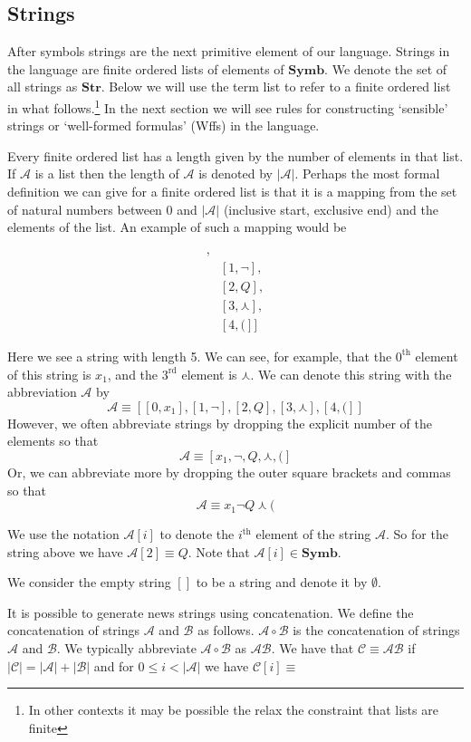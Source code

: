 \documentclass[12pt]{article}
\newcommand{\mc}[1]{\mathcal{#1}}
\begin{document}
\subsection{Strings}

After symbols strings are the next primitive element of our language.
Strings in the language are finite ordered lists of elements of $\textbf{Symb}$.
We denote the set of all strings as $\textbf{Str}$.
Below we will use the term list to refer to a finite ordered list in what follows.\footnote{In other contexts it may be possible the relax the constraint that lists are finite}
In the next section we will see rules for constructing `sensible' strings or `well-formed formulas' (Wffs) in the language.

Every finite ordered list has a length given by the number of elements in that list.
If $\mc{A}$ is a list then the length of $\mc{A}$ is denoted by $|\mc{A}|$.
Perhaps the most formal definition we can give for a finite ordered list is that it is a mapping from the set of natural numbers between 0 and $|\mc{A}|$ (inclusive start, exclusive end) and the elements of the list. 
An example of such a mapping would be

\begin{align*}
[&[0, x_1],\\
&[1, \lnot],\\
&[2, Q],\\
&[3, \curlywedge],\\
&[4, (]]
\end{align*}

Here we see a string with length 5.
We can see, for example, that the $0^{\text{th}}$ element of this string is $x_1$, and the $3^{\text{rd}}$ element is $\curlywedge$.
We can denote this string with the abbreviation $\mc{A}$ by 
$$
\mc{A} \equiv [[0, x_1], [1, \lnot], [2, Q], [3, \curlywedge], [4, (]]
$$
However, we often abbreviate strings by dropping the explicit number of the elements so that
$$
\mc{A} \equiv [x_1, \lnot, Q, \curlywedge, (]
$$
Or, we can abbreviate more by dropping the outer square brackets and commas so that
$$
\mc{A} \equiv x_1\lnot Q \curlywedge (
$$

We use the notation $\mc{A}[i]$ to denote the $i^{\text{th}}$ element of the string $\mc{A}$. 
So for the string above we have $\mc{A}[2] \equiv Q$.
Note that $\mc{A}[i] \in \textbf{Symb}$.

We consider the empty string $[]$ to be a string and denote it by $\emptyset$.

It is possible to generate news strings using concatenation.
We define the concatenation of strings $\mc{A}$ and $\mc{B}$ as follows.
$\mc{A}\circ\mc{B}$ is the concatenation of strings $\mc{A}$ and $\mc{B}$.
We typically abbreviate $\mc{A}\circ{\mc{B}}$ as $\mc{A}\mc{B}$.
We have that $\mc{C} \equiv \mc{A}\mc{B}$ if $|\mc{C}| = |\mc{A}| + |\mc{B}|$ and for $0 \le i < |\mc{A}|$ we have $\mc{C}[i] \equiv$
\end{document}
